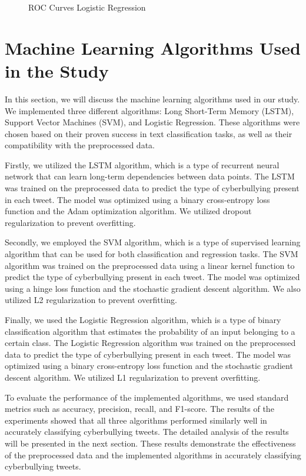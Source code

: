 \documentclass[conference]{IEEEtran}
\begin{document}
\begin{figure}[!htb]
{\caption{ROC Curves Logistic Regression}
\label{fig:cmp6}}
\end{figure}


\section{Machine Learning Algorithms Used in the Study}

In this section, we will discuss the machine learning algorithms used in our study. We implemented three different algorithms: Long Short-Term Memory (LSTM), Support Vector Machines (SVM), and Logistic Regression. These algorithms were chosen based on their proven success in text classification tasks, as well as their compatibility with the preprocessed data.

Firstly, we utilized the LSTM algorithm, which is a type of recurrent neural network that can learn long-term dependencies between data points. The LSTM was trained on the preprocessed data to predict the type of cyberbullying present in each tweet. The model was optimized using a binary cross-entropy loss function and the Adam optimization algorithm. We utilized dropout regularization to prevent overfitting.

Secondly, we employed the SVM algorithm, which is a type of supervised learning algorithm that can be used for both classification and regression tasks. The SVM algorithm was trained on the preprocessed data using a linear kernel function to predict the type of cyberbullying present in each tweet. The model was optimized using a hinge loss function and the stochastic gradient descent algorithm. We also utilized L2 regularization to prevent overfitting.

Finally, we used the Logistic Regression algorithm, which is a type of binary classification algorithm that estimates the probability of an input belonging to a certain class. The Logistic Regression algorithm was trained on the preprocessed data to predict the type of cyberbullying present in each tweet. The model was optimized using a binary cross-entropy loss function and the stochastic gradient descent algorithm. We utilized L1 regularization to prevent overfitting.

To evaluate the performance of the implemented algorithms, we used standard metrics such as accuracy, precision, recall, and F1-score. The results of the experiments showed that all three algorithms performed similarly well in accurately classifying cyberbullying tweets. The detailed analysis of the results will be presented in the next section. These results demonstrate the effectiveness of the preprocessed data and the implemented algorithms in accurately classifying cyberbullying tweets.
\end{document}
